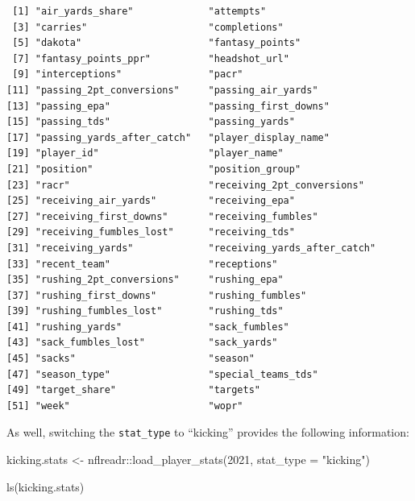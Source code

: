\documentclass[
  letterpaper,
]{krantz}
\newenvironment{Shaded}{\begin{snugshade}}{\end{snugshade}}
\newcommand{\AttributeTok}[1]{\textcolor[rgb]{0.40,0.45,0.13}{#1}}
\newcommand{\DecValTok}[1]{\textcolor[rgb]{0.68,0.00,0.00}{#1}}
\newcommand{\FunctionTok}[1]{\textcolor[rgb]{0.28,0.35,0.67}{#1}}
\newcommand{\NormalTok}[1]{\textcolor[rgb]{0.00,0.23,0.31}{#1}}
\newcommand{\OtherTok}[1]{\textcolor[rgb]{0.00,0.23,0.31}{#1}}
\newcommand{\SpecialCharTok}[1]{\textcolor[rgb]{0.37,0.37,0.37}{#1}}
\newcommand{\StringTok}[1]{\textcolor[rgb]{0.13,0.47,0.30}{#1}}
\begin{document}
\begin{verbatim}
 [1] "air_yards_share"             "attempts"                   
 [3] "carries"                     "completions"                
 [5] "dakota"                      "fantasy_points"             
 [7] "fantasy_points_ppr"          "headshot_url"               
 [9] "interceptions"               "pacr"                       
[11] "passing_2pt_conversions"     "passing_air_yards"          
[13] "passing_epa"                 "passing_first_downs"        
[15] "passing_tds"                 "passing_yards"              
[17] "passing_yards_after_catch"   "player_display_name"        
[19] "player_id"                   "player_name"                
[21] "position"                    "position_group"             
[23] "racr"                        "receiving_2pt_conversions"  
[25] "receiving_air_yards"         "receiving_epa"              
[27] "receiving_first_downs"       "receiving_fumbles"          
[29] "receiving_fumbles_lost"      "receiving_tds"              
[31] "receiving_yards"             "receiving_yards_after_catch"
[33] "recent_team"                 "receptions"                 
[35] "rushing_2pt_conversions"     "rushing_epa"                
[37] "rushing_first_downs"         "rushing_fumbles"            
[39] "rushing_fumbles_lost"        "rushing_tds"                
[41] "rushing_yards"               "sack_fumbles"               
[43] "sack_fumbles_lost"           "sack_yards"                 
[45] "sacks"                       "season"                     
[47] "season_type"                 "special_teams_tds"          
[49] "target_share"                "targets"                    
[51] "week"                        "wopr"                       
\end{verbatim}

As well, switching the \texttt{stat\_type} to ``kicking'' provides the
following information:

\begin{Shaded}
\begin{Highlighting}[]
\NormalTok{kicking.stats }\OtherTok{\textless{}{-}}\NormalTok{ nflreadr}\SpecialCharTok{::}\FunctionTok{load\_player\_stats}\NormalTok{(}\DecValTok{2021}\NormalTok{,}
                                             \AttributeTok{stat\_type =} \StringTok{"kicking"}\NormalTok{)}

\FunctionTok{ls}\NormalTok{(kicking.stats)}
\end{Highlighting}
\end{Shaded}
\end{document}
